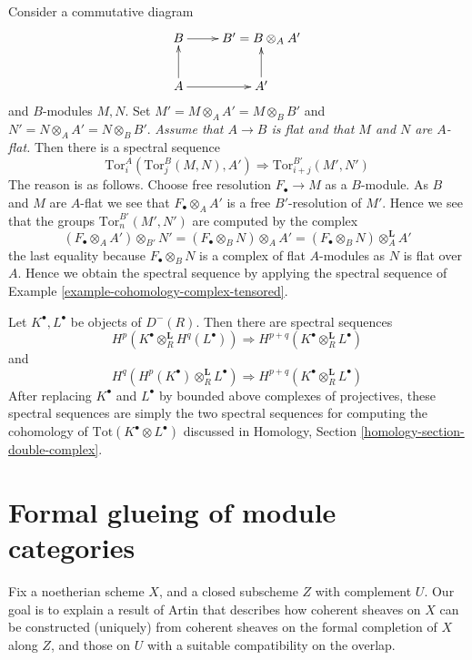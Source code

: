 \begin{example}
\label{example-tor-base-change}
Consider a commutative diagram
$$
\xymatrix{
B \ar[r] & B' = B \otimes_A A' \\
A \ar[r] \ar[u] & A' \ar[u]
}
$$
and $B$-modules $M, N$. Set $M' = M \otimes_A A' = M \otimes_B B'$
and $N' = N \otimes_A A' = N \otimes_B B'$.
{\it Assume that $A \to B$ is flat and that $M$ and $N$ are $A$-flat.}
Then there is a spectral sequence
$$
\text{Tor}^A_i(\text{Tor}_j^B(M, N), A')
\Rightarrow
\text{Tor}^{B'}_{i + j}(M', N')
$$
The reason is as follows. Choose free resolution
$F_\bullet \to M$ as a $B$-module. As $B$ and $M$ are $A$-flat we see
that $F_\bullet \otimes_A A'$ is a free $B'$-resolution of $M'$.
Hence we see that the groups $\text{Tor}^{B'}_n(M', N')$ are
computed by the complex
$$
(F_\bullet \otimes_A A') \otimes_{B'} N' =
(F_\bullet \otimes_B N) \otimes_A A' =
(F_\bullet \otimes_B N) \otimes^{\mathbf{L}}_A A'
$$
the last equality because $F_\bullet \otimes_B N$ is a complex
of flat $A$-modules as $N$ is flat over $A$. Hence we obtain the
spectral sequence by applying the spectral sequence of
Example \ref{example-cohomology-complex-tensored}.
\end{example}

\begin{example}
\label{example-tor}
Let $K^\bullet, L^\bullet$ be objects of $D^{-}(R)$.
Then there are spectral sequences
$$
H^p(K^\bullet \otimes_R^{\mathbf{L}} H^q(L^\bullet))
\Rightarrow H^{p + q}(K^\bullet \otimes_R^{\mathbf{L}} L^\bullet)
$$
and
$$
H^q(H^p(K^\bullet) \otimes_R^{\mathbf{L}} L^\bullet)
\Rightarrow H^{p + q}(K^\bullet \otimes_R^{\mathbf{L}} L^\bullet)
$$
After replacing $K^\bullet$ and $L^\bullet$ by bounded above complexes
of projectives, these spectral sequences are simply the two spectral
sequences for computing the cohomology of
$\text{Tot}(K^\bullet \otimes L^\bullet)$ discussed in
Homology, Section \ref{homology-section-double-complex}.
\end{example}



\section{Formal glueing of module categories}
\label{section-formal-glueing}

\noindent
Fix a noetherian scheme $X$, and a closed subscheme $Z$ with complement $U$. 
Our goal is to explain a result of Artin that describes how coherent sheaves on 
$X$ can be constructed (uniquely) from coherent sheaves on the formal 
completion of $X$ along $Z$, and those on $U$ with a suitable compatibility on 
the overlap.

